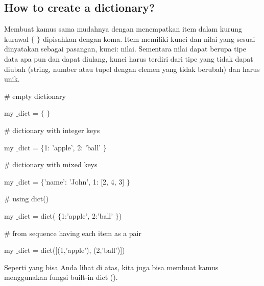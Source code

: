 \subsection*{How to create a dictionary?}
 \par
\noindent 
Membuat kamus sama mudahnya dengan menempatkan item dalam kurung kurawal  $  \{  $ $  \}  $ dipisahkan dengan koma. Item memiliki kunci dan nilai yang sesuai dinyatakan sebagai pasangan, kunci: nilai. Sementara nilai dapat berupa tipe data apa pun dan dapat diulang, kunci harus terdiri dari tipe yang tidak dapat diubah (string, number atau tupel dengan elemen yang tidak berubah) dan harus unik. \par
\noindent 
{\fontsize{11pt}{11pt}\selectfont  \hspace*{0.5in}  $  \#  $ empty dictionary} \par
\noindent 
{\fontsize{11pt}{11pt}\selectfont  \hspace*{0.5in} my $  \_  $dict =  $  \{  $ $  \}  $} \par
\vspace{11pt}
\noindent 
{\fontsize{11pt}{11pt}\selectfont  \hspace*{0.5in}  $  \#  $ dictionary with integer keys} \par
\noindent 
{\fontsize{11pt}{11pt}\selectfont  \hspace*{0.5in} my $  \_  $dict =  $  \{  $1: 'apple', 2: 'ball' $  \}  $} \par
\vspace{11pt}
\noindent 
{\fontsize{11pt}{11pt}\selectfont  \hspace*{0.5in}  $  \#  $ dictionary with mixed keys} \par
\noindent 
{\fontsize{11pt}{11pt}\selectfont  \hspace*{0.5in} my $  \_  $dict =  $  \{  $'name': 'John', 1: [2, 4, 3] $  \}  $} \par
\vspace{11pt}
\noindent 
{\fontsize{11pt}{11pt}\selectfont  \hspace*{0.5in}  $  \#  $ using dict()} \par
\noindent 
{\fontsize{11pt}{11pt}\selectfont  \hspace*{0.5in} my $  \_  $dict = dict( $  \{  $1:'apple', 2:'ball' $  \}  $)} \par
\vspace{11pt}
\noindent 
{\fontsize{11pt}{11pt}\selectfont  \hspace*{0.5in}  $  \#  $ from sequence having each item as a pair} \par
\noindent 
{\fontsize{11pt}{11pt}\selectfont  \hspace*{0.5in} my $  \_  $dict = dict([(1,'apple'), (2,'ball')])} \par
\noindent 
Seperti yang bisa Anda lihat di atas, kita juga bisa membuat kamus menggunakan fungsi built-in dict (). \par
\noindent 
